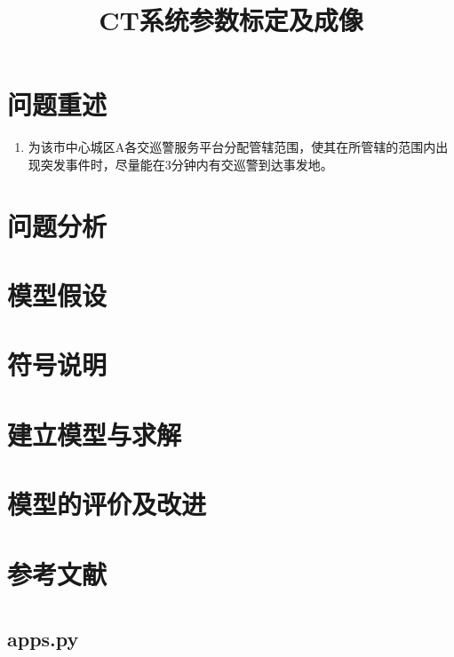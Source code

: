\documentclass[withoutpreface,bwprint]{cumcmthesis} %
\title{CT系统参数标定及成像}
\begin{document}
\maketitle
\begin{abstract}


\end{abstract}

\section{问题重述}

  \begin{enumerate}
    \item 为该市中心城区A各交巡警服务平台分配管辖范围，使其在所管辖的范围内出现突发事件时，尽量能在3分钟内有交巡警到达事发地。
  \end{enumerate}

\section{问题分析}
\section{模型假设}
\section{符号说明}
\section{建立模型与求解}
\section{模型的评价及改进}
\section{参考文献}



  \newpage
  \appendix
\section{}
  \subsection{apps.py}
    
\end{document}
